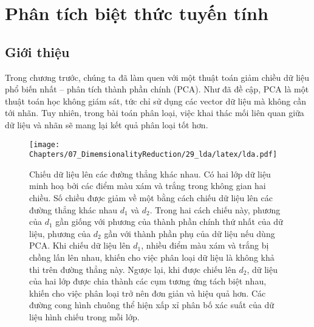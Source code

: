 \chapter{Phân tích biệt thức tuyến tính}
\section{Giới thiệu}
Trong chương trước, chúng ta đã làm quen với một thuật toán giảm chiều dữ liệu
phổ biến nhất  --  phân tích thành phần chính (PCA). Như đã đề cập, PCA là một thuật toán học không giám sát, tức chỉ sử dụng các vector dữ liệu mà
không cần tới nhãn. Tuy nhiên, trong bài toán phân loại,
việc khai thác mối liên quan giữa dữ liệu và nhãn sẽ mang lại kết quả phân loại
tốt hơn.
 
\begin{figure}[t]
\centering
    \texttt{[image: Chapters/07\_DimemsionalityReduction/29\_lda/latex/lda.pdf]}
    \caption[]{Chiếu dữ liệu lên các đường thẳng khác nhau. Có hai lớp dữ liệu
    minh hoạ bởi các điểm màu xám và trắng trong không gian hai chiều. Số chiều
    được giảm về một bằng cách chiếu dữ liệu lên các đường thẳng khác nhau $d_1$
    và $d_2$. Trong hai cách chiếu này, phương của $d_1$ gần giống với phương
    của thành phần chính thứ nhất của dữ liệu, phương của $d_2$ gần với thành
    phần phụ của dữ liệu nếu dùng PCA. Khi chiếu dữ liệu lên $d_1$, nhiều điểm
    màu xám và trắng bị chồng lấn lên nhau, khiến cho việc phân loại dữ liệu là
    không khả thi trên đường thẳng này. Ngược lại, khi được chiếu lên $d_2$, dữ
    liệu của hai lớp được chia thành các cụm tương ứng tách biệt nhau, khiến cho
    việc phân loại trở nên đơn giản và hiệu quả hơn. Các đường cong hình
    chuông thể hiện xấp xỉ phân bố xác suất của dữ liệu hình chiếu trong mỗi
    lớp.}
    \label{fig:29_1}
\end{figure}
 
